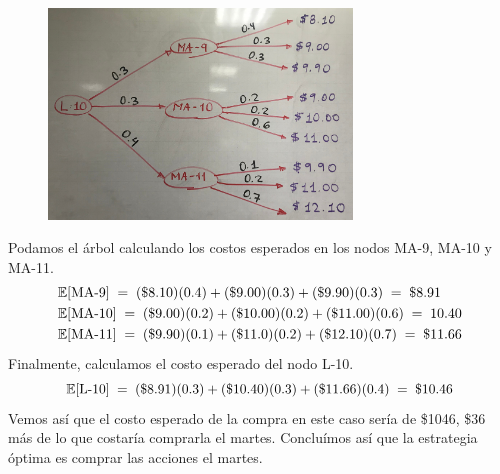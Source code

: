 \documentclass[ a4paper, twoside, 11pt]{article}
\begin{document}
\begin{problem}
\begin{figure}[H]
\centering
\includegraphics[width=0.72\textwidth]{problema-2.jpg}
\end{figure}

Podamos el \'arbol calculando los costos esperados en los nodos MA-9, MA-10 y MA-11. 
\begin{align*}
& \mathbb{E}[\text{MA-9}] \; = \; 
(\$8.10)(0.4) + (\$9.00)(0.3) + (\$9.90)(0.3)
\; = \; \$8.91 \\
& \mathbb{E}[\text{MA-10}] \; = \; 
(\$9.00)(0.2) + (\$10.00)(0.2) + (\$11.00)(0.6)
\; = \; 10.40 \\
& \mathbb{E}[\text{MA-11}] \; = \; 
(\$9.90)(0.1) + (\$11.0)(0.2) + (\$12.10)(0.7) \; = \; \$11.66
\end{align*}
Finalmente, calculamos el costo esperado del nodo L-10. 
\[
\mathbb{E}[\text{L-10}] \; = \;
(\$8.91)(0.3) + (\$10.40)(0.3) + (\$11.66)(0.4) \; = \; \$10.46
\]
Vemos as\'i que el costo esperado de la compra en este caso ser\'ia de \$1046, \ie \$36 m\'as de lo que costar\'ia comprarla el martes. Conclu\'imos as\'i que la estrategia \'optima es comprar las acciones el martes. 


\end{problem}
\end{document}
